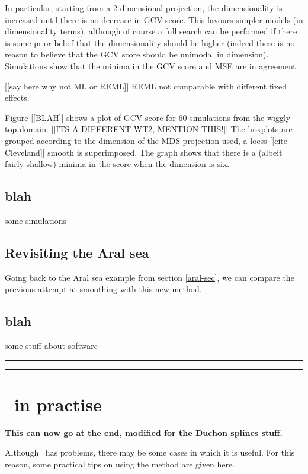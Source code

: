 {In particular, starting from a 2-dimensional projection, the dimensionality is increased until there is no decrease in GCV score. This favours simpler models (in dimensionality terms), although of course a full search can be performed if there is some prior belief that the dimensionality should be higher (indeed there is no reason to believe that the GCV score should be unimodal in dimension). Simulations show that the minima in the GCV score and MSE are in agreement.

[[say here why not ML or REML]] REML not comparable with different fixed effects.

Figure [[BLAH]] shows a plot of GCV score for 60 simulations from the wiggly top domain. [[ITS A DIFFERENT WT2, MENTION THIS!]] The boxplots are grouped according to the dimension of the MDS projection used, a loess [[cite Cleveland]] smooth is superimposed. The graph shows that there is a (albeit fairly shallow) minima in the score when the dimension is six.


\subsection{blah}

some simulations


\subsection{Revisiting the Aral sea}

Going back to the Aral sea example from section \ref{aral-sec}, we can compare the previous attempt at smoothing with this new method.




\subsection{blah}

some stuff about software




\rule{6in}{1pt}

\rule{6in}{1pt}


\section{\mdsap\ in practise}
\label{mds-prac}

\textbf{This can now go at the end, modified for the Duchon splines stuff.}

Although \mdsap\ has problems, there may be some cases in which it is useful. For this reason, some practical tips on using the method are given here.

}
